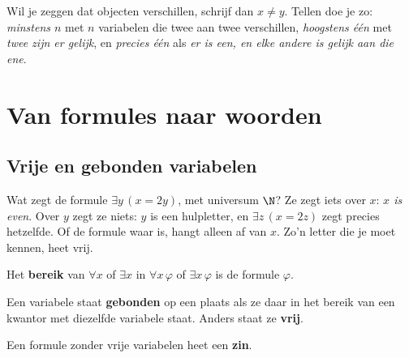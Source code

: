 
\begin{werkwijze}
Wil je zeggen dat objecten verschillen, schrijf dan $x \neq y$. Tellen doe je zo: \textit{minstens $n$} met $n$ variabelen die twee aan twee verschillen, \textit{hoogstens één} met \textit{twee zijn er gelijk}, en \textit{precies één} als \textit{er is een, en elke andere is gelijk aan die ene}.
\end{werkwijze}

\begin{oefeningen}
\end{oefeningen}

\section{Van formules naar woorden}\label{sec:h1-lezen}

\subsection{Vrije en gebonden variabelen}

Wat zegt de formule $\exists y\, (x = 2y)$, met universum $\N$? Ze zegt iets over $x$: \textit{$x$ is even}. Over $y$ zegt ze niets: $y$ is een hulpletter, en $\exists z\, (x = 2z)$ zegt precies hetzelfde. Of de formule waar is, hangt alleen af van $x$. Zo'n letter die je moet kennen, heet vrij.

\begin{theorie}
Het \textbf{\textcolor{accent}{bereik}} van $\forall x$ of $\exists x$ in $\forall x\, \varphi$ of $\exists x\, \varphi$ is de formule $\varphi$.

\vspace{1mm}
Een variabele staat \textbf{\textcolor{accent}{gebonden}} op een plaats als ze daar in het bereik van een kwantor met diezelfde variabele staat. Anders staat ze \textbf{\textcolor{accent}{vrij}}.

\vspace{1mm}
Een formule zonder vrije variabelen heet een \textbf{\textcolor{accent}{zin}}.
\end{theorie}

